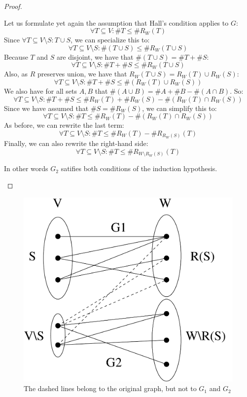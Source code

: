 \begin{proof}
\begin{itemize}
\begin{itemize}
\begin{itemize}
\begin{itemize}
Let us formulate yet again the assumption that Hall's condition applies to $G$:
\[ \forall T \subseteq V: \#T \leq \#R_W(T) \]
Since $\forall T \subseteq V\setminus S: T \cup S$, we can specialize this to:
\[ \forall T \subseteq V \setminus S: \#(T \cup S) \leq \#R_W(T \cup S) \]
Because $T$ and $S$ are disjoint, we have that $\#(T \cup S) = \#T + \#S$:
\[ \forall T \subseteq V \setminus S: \#T + \#S \leq \#R_W(T \cup S) \]
Also, as $R$ preserves union, we have that $R_W(T \cup S) = R_W(T) \cup R_W(S)$:
\[ \forall T \subseteq V \setminus S: \#T + \#S \leq \#(R_W(T) \cup R_W(S)) \]
We also have for all sets $A, B$ that $\#(A \cup B) = \#A + \#B - \#(A \cap B)$.
So:
\[ \forall T \subseteq V \setminus S: \#T + \#S \leq \#R_W(T) + \#R_W(S) - \#(R_W(T) \cap R_W(S)) \]
Since we have assumed that $\#S = \#R_W(S)$, we can simplify this to:
\[ \forall T \subseteq V \setminus S: \#T \leq \#R_W(T) - \#(R_W(T) \cap R_W(S)) \]
As before, we can rewrite the last term:
\[ \forall T \subseteq V \setminus S: \#T \leq \#R_W(T) - \#R_{R_W(S)}(T) \]
Finally, we can also rewrite the right-hand side:
\[ \forall T \subseteq V \setminus S: \#T \leq \#R_{W \setminus R_W(S)}(T) \]

In other words $G_2$ satifies both conditions of
the induction hypothesis.

\end{itemize}
\end{itemize}
\end{itemize}

\end{itemize}
\end{proof}

\begin{figure}[h]
\begin{center}
\includegraphics[height=0.35\textheight,keepaspectratio]{hall}
\caption{The dashed lines belong to the original graph, but not to $G_1$ and $G_2$}\label{hallfig}
\end{center}
\end{figure}

